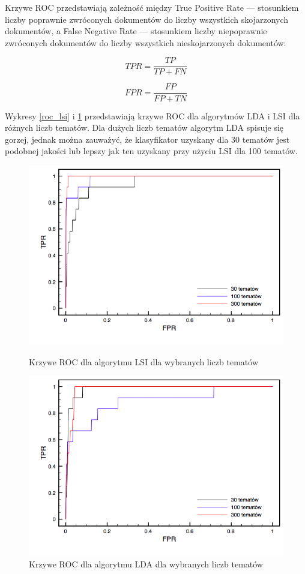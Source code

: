 \documentclass[11pt,a4paper]{article}
\begin{document}
Krzywe ROC przedstawiają zależność między True Positive Rate --- stosunkiem
liczby poprawnie zwróconych dokumentów do liczby wszystkich skojarzonych
dokumentów, a False Negative Rate --- stosunkiem liczby niepoprawnie zwróconych
dokumentów do liczby wszystkich nieskojarzonych dokumentów:

\begin{equation}
TPR = \frac{TP}{TP + FN}
\end{equation}

\begin{equation}
FPR = \frac{FP}{FP + TN}
\end{equation}

Wykresy \ref{roc_lsi} i \ref{roc_lda} przedstawiają krzywe ROC dla algorytmów
LDA i LSI dla różnych liczb tematów.  Dla dużych liczb tematów algorytm LDA
spisuje się gorzej, jednak można zauważyć, że klasyfikator uzyskany dla 30
tematów jest podobnej jakości lub lepszy jak ten uzyskany przy użyciu LSI dla
100 tematów.


\begin{figure}[h]
\includegraphics[width=\linewidth]{gfx/lsi_roc.png}
\caption{Krzywe ROC dla algorytmu LSI dla wybranych liczb tematów}
\label{roc_lsi}

\includegraphics[width=\linewidth]{gfx/lda_roc.png}
\caption{Krzywe ROC dla algorytmu LDA dla wybranych liczb tematów}
\label{roc_lda}
\end{figure}
\end{document}
